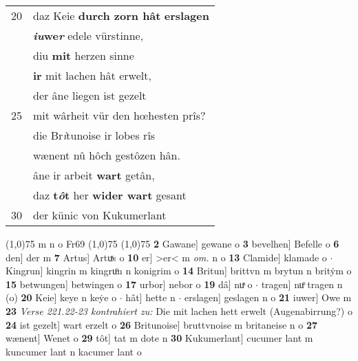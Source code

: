 \documentclass[8pt,a4paper,notitlepage]{article}
\begin{document}
\begin{table}[ht]
\begin{minipage}[t]{0.5\linewidth}
\begin{tabular}{rl}
20 & daz Keie \textbf{durch zorn hât} \textbf{erslagen}\\ 
 & \textbf{\textit{iu}we\textit{r}} edele vürstinne,\\ 
 & diu \textbf{mit} herzen sinne\\ 
 & \textbf{ir} mit lachen hât erwelt,\\ 
 & der âne liegen ist gezelt\\ 
25 & mit wârheit vür den hœhesten prîs?\\ 
 & die Br\textit{i}tunoise ir lobes rîs\\ 
 & wænent nû hôch gestôzen hân.\\ 
 & âne ir arbeit \textbf{wart} getân,\\ 
 & daz \textbf{t\textit{ô}t} her \textbf{wider wart} gesant\\ 
30 & der künic von Kukumerlant\\ 
\end{tabular}
\scriptsize
\line(1,0){75} \newline
m n o Fr69 \newline
\line(1,0){75} \newline
\newline
\line(1,0){75} \newline
\textbf{2} Gawane] gewane o \textbf{3} bevelhen] Befelle o \textbf{6} den] der m \textbf{7} Artus] Artuͯs o \textbf{10} er] >er< m \textit{om.} n o \textbf{13} Clamide] klamade o  $\cdot$ Kingrun] kingrin m kingruͦn n konigrim o \textbf{14} Britun] brittvn m brytun n britẏm o \textbf{15} betwungen] betwingen o \textbf{17} urbor] nebor o \textbf{19} dâ] nuͯ o  $\cdot$ tragen] nuͦ tragen n (o) \textbf{20} Keie] keye n keẏe o  $\cdot$ hât] hette n  $\cdot$ erslagen] geslagen n o \textbf{21} iuwer] Owe m \textbf{23} \textit{Verse 221.22-23 kontrahiert zu:} Die mit lachen hett erwelt (Augenabirrung?) o  \textbf{24} ist gezelt] wart erzelt o \textbf{26} Britunoise] bruttvnoise m britaneise n o \textbf{27} wænent] Wenet o \textbf{29} tôt] tat m dote n \textbf{30} Kukumerlant] cucumer lant m kuncumer lant n kacumer lant o \newline
\end{minipage}
\end{table}
\newpage
\end{document}
